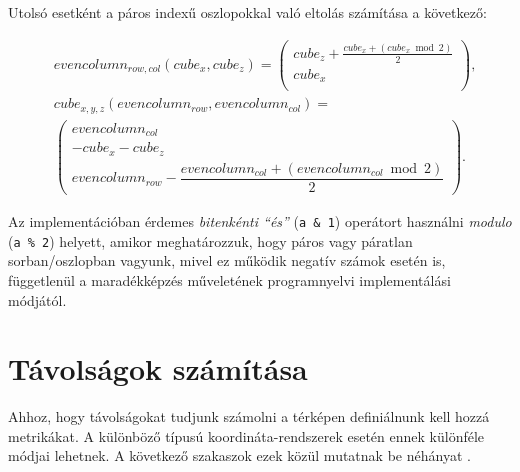 %

Utolsó esetként a páros indexű oszlopokkal való eltolás számítása a következő:

\begin{align*}
&evencolumn_{row, col}(cube_{x}, cube_{z}) =
\left(
\begin{array}{c}
cube_{z} + \frac{cube_{x} + (cube_{x} \bmod 2)}{2} \\
cube_{x} \\
\end{array}
\right),
\\
&cube_{x,y,z}(evencolumn_{row}, evencolumn_{col}) = \\
&\left(
\begin{array}{c}
evencolumn_{col} \\
-cube_{x} - cube_{z} \\
evencolumn_{row} - \dfrac{evencolumn_{col} + (evencolumn_{col} \bmod 2)}{2}
\end{array}
\right).
\end{align*}

%

Az implementációban érdemes \textit{bitenkénti “és”} (\texttt{a \& 1}) operátort használni \textit{modulo} (\texttt{a \% 2}) helyett, amikor meghatározzuk, hogy páros vagy páratlan sorban/oszlopban vagyunk, mivel ez működik negatív számok esetén is, függetlenül a maradékképzés műveletének programnyelvi implementálási módjától.

\newpage
\section{Távolságok számítása}
\label{sec:tavolsag}

Ahhoz, hogy távolságokat tudjunk számolni a térképen definiálnunk kell hozzá metrikákat. A különböző típusú koordináta-rendszerek esetén ennek különféle módjai lehetnek. A következő szakaszok ezek közül mutatnak be néhányat \cite{Distance}.

